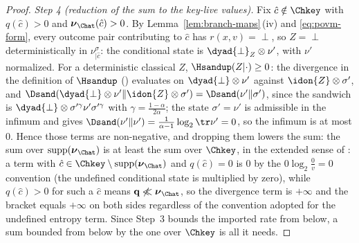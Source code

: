 \begin{proof}
\emph{Step 4 (reduction of the sum to the key-live values).} Fix
$\hat c\notin\Chkey$ with $q(\hat c)>0$ and
$\boldsymbol{\nu}_{\Chat}(\hat c)>0$. By Lemma~\ref{lem:branch-maps}\,(iv) and
\eqref{eq:povm-form}, every outcome pair contributing to $\hat c$ has
$r(x,v)=\perp$, so $Z=\perp$ deterministically in
$\nu^{\sigma}_{|\hat c}$: the conditional state is
$\dyad{\perp}_Z\otimes\nu'$, with $\nu'$ normalized. For a deterministic
classical $Z$, $\Hsandup(Z|\cdot)\ge0$: the divergence in the definition of
$\Hsandup$ () evaluates on
$\dyad{\perp}\otimes\nu'$ against $\idon{Z}\otimes\sigma'$, and
$\Dsand(\dyad{\perp}\otimes\nu'\|\idon{Z}\otimes\sigma')
=\Dsand(\nu'\|\sigma')$, since the sandwich is
$\dyad{\perp}\otimes\sigma'^{\gamma}\nu'\sigma'^{\gamma}$ with
$\gamma=\frac{1-\alpha}{2\alpha}$; the state $\sigma'=\nu'$ is admissible in
the infimum and gives
$\Dsand(\nu'\|\nu')=\frac{1}{\alpha-1}\log_2\tr\nu'=0$, so the infimum is at
most $0$. Hence those terms are non-negative, and dropping them lowers the
sum: the sum over $\operatorname{supp}(\boldsymbol{\nu}_{\Chat})$ is at least
the sum over $\Chkey$, in the extended sense of : a
term with
$\hat c\in\Chkey\setminus\operatorname{supp}(\boldsymbol{\nu}_{\Chat})$
and $q(\hat c)=0$ is $0$ by the $0\log_2\frac0v=0$ convention (the
undefined conditional state is multiplied by zero), while $q(\hat c)>0$
for such a $\hat c$ means $\mathbf q\not\ll\boldsymbol{\nu}_{\Chat}$, so
the divergence term is $+\infty$ and the bracket equals $+\infty$ on
both sides regardless of the convention adopted for the undefined
entropy term. Since Step~3 bounds the imported rate from below, a sum
bounded from below by the one over $\Chkey$ is all it needs.
\end{proof}
